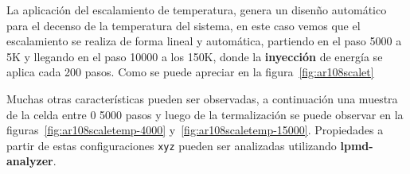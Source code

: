 La aplicaci\'on del escalamiento de temperatura, genera un disen\~no autom\'atico para el decenso de la temperatura del sistema, en este caso vemos que el escalamiento se realiza de forma lineal y autom\'atica, partiendo en el paso 5000 a 5K y llegando en el paso 10000 a los 150K, donde la \textbf{inyecci\'on} de energ\'ia se aplica cada 200 pasos. Como se puede apreciar en la figura~\ref{fig:ar108scalet}


Muchas otras caracter\'isticas pueden ser observadas, a continuaci\'on una muestra de la celda entre 0 5000 pasos y luego de la termalizaci\'on se puede observar en la figuras~\ref{fig:ar108scaletemp-4000} y~\ref{fig:ar108scaletemp-15000}. Propiedades a partir de estas configuraciones \verb|xyz| pueden ser analizadas utilizando \textbf{lpmd-analyzer}.

